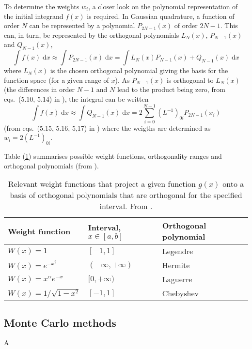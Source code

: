 \documentclass[a4paper,11pt]{article}
\newcommand{\diff}{\ensuremath{\; \text{d}}}
\begin{document}
To determine the weights $w_i$, a closer look on the polynomial representation of the initial integrand $f(x)$ is required. In Gaussian quadrature, a function of order $N$ can be represented by a polynomial $P_{2N-1}(x)$ of order $2N-1$. This can, in turn, be represented by the orthogonal polynomials $L_N(x)$, $P_{N-1}(x)$ and $Q_{N-1}(x)$,
\begin{equation}
    \int f(x) \diff x \approx \int P_{2N-1}(x) \diff x = \int L_N(x) P_{N-1}(x) + Q_{N-1}(x) \diff x
    \label{eq:quadrature}
\end{equation}
where $L_N(x)$ is the chosen orthogonal polynomial giving the basis for the function space (for a given range of $x$). As $P_{N-1}(x)$ is orthogonal to $L_N(x)$ (the differences in order $N-1$ and $N$ lead to the product being zero, from eqs.~(5.10, 5.14) in \cite{MHJ:2013}), the integral can be written
\[ \int f(x) \diff x \approx \int Q_{N-1}(x) \diff x = 2 \sum_{i=0}^{N-1} \left( L^{-1} \right)_{0i} P_{2N-1}(x_i) \]
(from eqs.~(5.15, 5.16, 5,17) in \cite{MHJ:2013}) where the weigths are determined as $w_i = 2 \left( L^{-1} \right)_{0i}$.

Table (\ref{tab:polys}) summarises possible weight functions, orthogonality ranges and orthogonal polynomials (from \cite{MHJ:2013}).

\begin{table}
    \centering
    \caption{Relevant weight functions that project a given function $g(x)$ onto a basis of orthogonal polynomials that are orthogonal for the specified interval. From \cite{MHJ:2013}.}
    \begin{tabular}{l l l}
        \hline 
        Weight function & Interval, $x\in[a,b]$ & Orthogonal polynomial \\
        \hline
        $W(x) = 1$          & $[-1,1]$              & Legendre \\
        $W(x) = e^{-x^2}$   & $(-\infty, +\infty)$  & Hermite \\
        $W(x) = x^\alpha e^{-x}$ & $[0, +\infty)$   & Laguerre \\
        $W(x) = 1/\sqrt{1 - x^2}$& $[-1, 1]$        & Chebyshev \\
        \hline
    \end{tabular}
    \label{tab:polys}
\end{table}

\subsection{Monte Carlo methods}
A 
\end{document}

